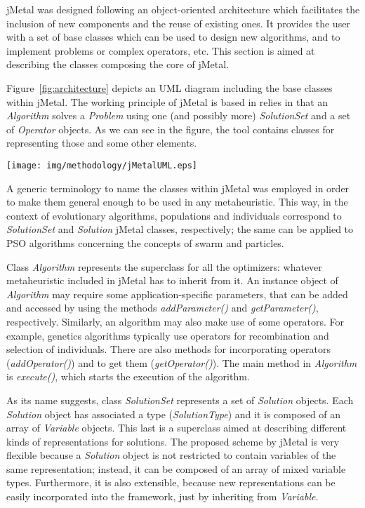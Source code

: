 jMetal was designed following an object-oriented architecture which facilitates the inclusion of new components and the reuse of existing ones. It provides the user with a set of base classes which can be used to design new algorithms, and to implement problems or complex operators, etc. This section is aimed at describing the classes composing the core of jMetal. %

Figure~\ref{fig:architecture} depicts an UML diagram including the base classes within jMetal.
The working principle of jMetal is based in relies in that an {\it Algorithm} solves a {\it Problem} using one (and possibly more) {\it SolutionSet} and a set of {\it Operator} objects. As we can see in the figure, the tool contains classes for representing those and some other elements.

\begin{figure*}[!h]%
	\centerline{\texttt{[image: img/methodology/jMetalUML.eps]}}
	\caption{General architecture of jMetal.}
	\label{fig:architecture} 
\end{figure*}

A generic terminology to name the classes within jMetal was employed in order to make them general enough to be used in any metaheuristic. This way, in the context of evolutionary algorithms, populations and individuals correspond to {\it SolutionSet} and {\it Solution} jMetal classes, respectively; the same can be applied to PSO algorithms concerning the concepts of swarm and particles.

Class {\it Algorithm} represents the superclass for all the optimizers: whatever metaheuristic included in jMetal has to inherit from it. An instance object of {\it Algorithm} may require some application-specific parameters, that can be added and accessed by using the methods {\it addParameter()} and {\it getParameter()}, respectively. Similarly, an algorithm may also make use of some operators. For example, genetics algorithms typically use operators for recombination and selection of individuals. There are also methods for incorporating operators ({\it addOperator()}) and to get them ({\it getOperator()}). The main method in {\it Algorithm} is {\it execute()}, which starts the execution of the algorithm. 

As its name suggests, class {\it SolutionSet} represents a set of {\it Solution} objects. Each {\it Solution} object has associated a type ({\it SolutionType}) and it is composed of an array of {\it Variable} objects. This last is a superclass aimed at describing different kinds of representations for solutions. The proposed scheme by jMetal is very flexible because a {\it Solution} object is not restricted to contain variables of the same representation; instead, it can be composed of an array of mixed variable types. Furthermore, it is also extensible, because new representations can be easily incorporated into the framework, just by inheriting from {\it Variable}.

